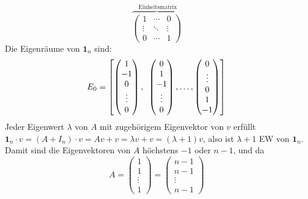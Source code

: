 \begin{solution}
\begin{enumerate}[label= (\alph*)]
\begin{equation*}
      \overbrace{\begin{pmatrix}
        1 & \cdots & 0 \\
        \vdots & \ddots & \vdots \\
        0 & \cdots & 1
      \end{pmatrix}}^\text{ Einheitsmatrix}
    \end{equation*}
    Die Eigenräume von \( \textbf{1}_n \) sind:
    \begin{equation*}
      E_0 = \left[\begin{pmatrix}
        1 \\ -1 \\ 0 \\ \vdots \\ 0
      \end{pmatrix},\enskip
      \begin{pmatrix}
        0 \\ 1 \\ -1 \\ \vdots \\ 0
      \end{pmatrix},\dots,
      \begin{pmatrix}
        0 \\ \vdots \\ 0 \\ 1 \\ -1
      \end{pmatrix} 
      \right]
    \end{equation*} 
    Jeder Eigenwert \( \lambda \) von \( A \) mit zugehörigem Eigenvektor von \( v \) erfüllt \\
    \( \textbf{1}_n \cdot v = (A + I_n) \cdot v = Av + v = \lambda v + v = (\lambda + 1)v \), also ist \( \lambda +1 \) EW von \( \textbf{1}_n \). \\
    Damit sind die Eigenvektoren von \( A \) höchstens \( -1 \) oder \( n-1 \), und da 
    \begin{equation*}
      A = \begin{pmatrix}
        1 \\ 1 \\ \vdots \\ 1
      \end{pmatrix} = 
      \begin{pmatrix}
        n-1 \\ n-1 \\ \vdots \\ n-1
      \end{pmatrix}
    \end{equation*}

\end{enumerate}
\end{solution}
